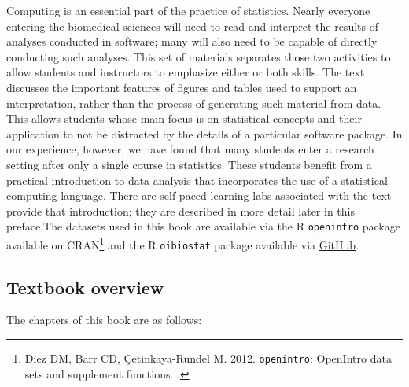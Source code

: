 Computing is an essential part of the practice of statistics.  Nearly everyone entering the biomedical sciences will need to read and interpret the results of analyses conducted in software; many will also need to be capable of directly conducting such analyses. This set of materials separates those two activities to allow students and instructors to emphasize either or both skills. The text discusses the important features of figures and tables used to support an interpretation, rather than the process of generating such material from data. This allows students whose main focus is on statistical concepts and their application to not be distracted by the details of a particular software package. In our experience, however, we have found that many students enter a research setting after only a single course in statistics. These students benefit from a practical introduction to data analysis that incorporates the use of a statistical computing language. There are self-paced learning labs associated with the text provide that introduction; they are described in more detail later in this preface.The datasets used in this book are available via the \textsf{R} \texttt{openintro} package available on CRAN\footnote{Diez DM, Barr CD, \c{C}etinkaya-Rundel M. 2012. \texttt{openintro}: OpenIntro data sets and supplement functions. .}  and the \textsf{R} \texttt{oibiostat} package available via \href{<https://github.com/OI-Biostat/oi_biostat_data>}{GitHub}.

\subsection*{Textbook overview}

The chapters of this book are as follows:


